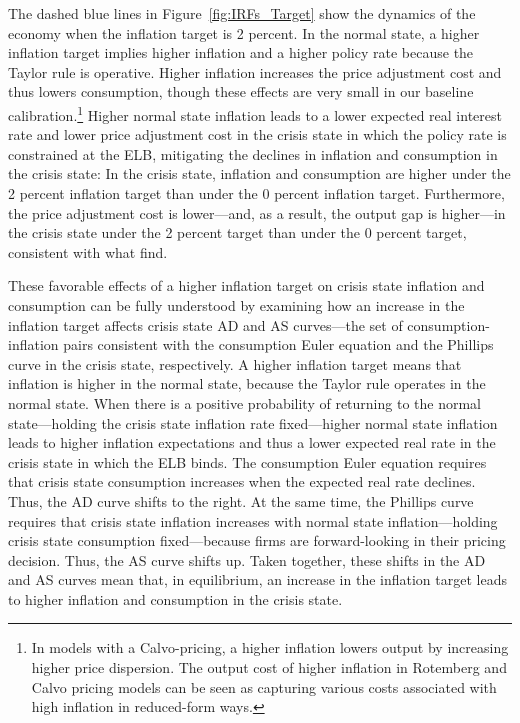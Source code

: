 \documentclass[11pt]{article}
\begin{document}
	The dashed blue lines in Figure~\ref{fig:IRFs_Target} show the dynamics of the economy when the inflation target is 2 percent. In the normal state, a higher inflation target implies higher inflation and a higher policy rate because the Taylor rule is operative. Higher inflation increases the price adjustment cost and thus lowers consumption, though these effects are very small in our baseline calibration.\footnote{In models with a Calvo-pricing, a higher inflation lowers output by increasing higher price dispersion. The output cost of higher inflation in Rotemberg and Calvo pricing models can be seen as capturing various costs associated with high inflation in reduced-form ways.} Higher normal state inflation leads to a lower expected real interest rate and lower price adjustment cost in the crisis state in which the policy rate is constrained at the ELB, mitigating the declines in inflation and consumption in the crisis state: In the crisis state, inflation and consumption are higher under the 2 percent inflation target than under the 0 percent inflation target. Furthermore, the price adjustment cost is lower---and, as a result, the output gap is higher---in the crisis state under the 2 percent target than under the 0 percent target, consistent with what \citet{MertensRavn2014} find.

	These favorable effects of a higher inflation target on crisis state inflation and consumption can be fully understood by examining how an increase in the inflation target affects crisis state AD and AS curves---the set of consumption-inflation pairs consistent with the consumption Euler equation and the Phillips curve in the crisis state, respectively. A higher inflation target means that inflation is higher in the normal state, because the Taylor rule operates in the normal state. When there is a positive probability of returning to the normal state---holding the crisis state inflation rate fixed---higher normal state inflation leads to higher inflation expectations and thus a lower expected real rate in the crisis state in which the ELB binds. The consumption Euler equation requires that crisis state consumption increases when the expected real rate declines. Thus, the AD curve shifts to the right. At the same time, the Phillips curve requires that crisis state inflation increases with normal state inflation---holding crisis state consumption fixed---because firms are forward-looking in their pricing decision. Thus, the AS curve shifts up. Taken together, these shifts in the AD and AS curves mean that, in equilibrium, an increase in the inflation target leads to higher inflation and consumption in the crisis state.
\end{document}
